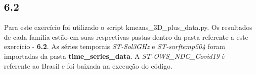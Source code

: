 \begin{figure}[ht!]
	\vspace{-4mm}	%
	\begin{center}
	\end{center}
	\vspace{-2mm}	%
	\label{ex6_fig1}
\end{figure}

\clearpage
\subsection*{6.2}
%

Para este exercício foi utilizado o script kmeans\_3D\_plus\_data.py. Os resultados de cada família estão em suas respectivas pastas dentro da pasta referente a este exercício - \textbf{6.2}. As séries temporais \textit{ST-Sol3GHz} e \textit{ST-surftemp504} foram importadas da pasta \textbf{time\_series\_data}. A \textit{ST-OWS\_NDC\_Covid19} é referente ao Brasil e foi baixada na execução do código. 


